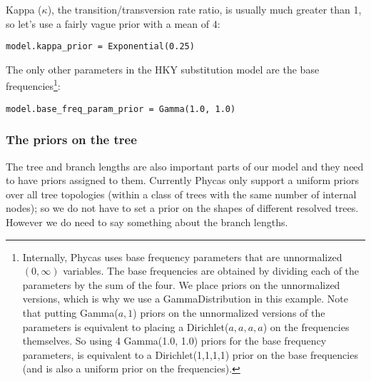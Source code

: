\documentclass{article}
\newcommand{\phycas}{Phycas\xspace}
\begin{document}
Kappa ($\kappa$), the transition/transversion rate ratio, is usually much greater than 1, so let's use a fairly vague prior with a mean of 4:
\begin{verbatim}
model.kappa_prior = Exponential(0.25)
\end{verbatim}

The only other parameters in the HKY substitution model are the base frequencies\footnote{
Internally, \phycas uses base frequency parameters that are unnormalized $(0,\infty)$ variables.
The base frequencies are obtained by dividing each of the parameters by the sum of the four.
We place priors on the unnormalized versions, which is why we use a GammaDistribution in this example.
Note that putting Gamma($a,1$) priors on the unnormalized versions of the parameters is 
equivalent to placing a Dirichlet($a,a,a,a$) on the frequencies themselves.
So using 4 Gamma(1.0, 1.0) priors for the base frequency parameters, is equivalent to a Dirichlet(1,1,1,1)
prior on the base frequencies (and is also a uniform prior on the frequencies).
}:
\begin{verbatim}
model.base_freq_param_prior = Gamma(1.0, 1.0)
\end{verbatim}

\subsubsection{The priors on the tree}
The tree and branch lengths are also important parts of our model and they need to have
priors assigned to them.
Currently \phycas only support a uniform priors over all tree topologies (within a
class of trees with the same number of internal nodes); so we do not have to set
a prior on the shapes of different resolved trees.
However we do need to say something about the branch lengths.
\end{document}
